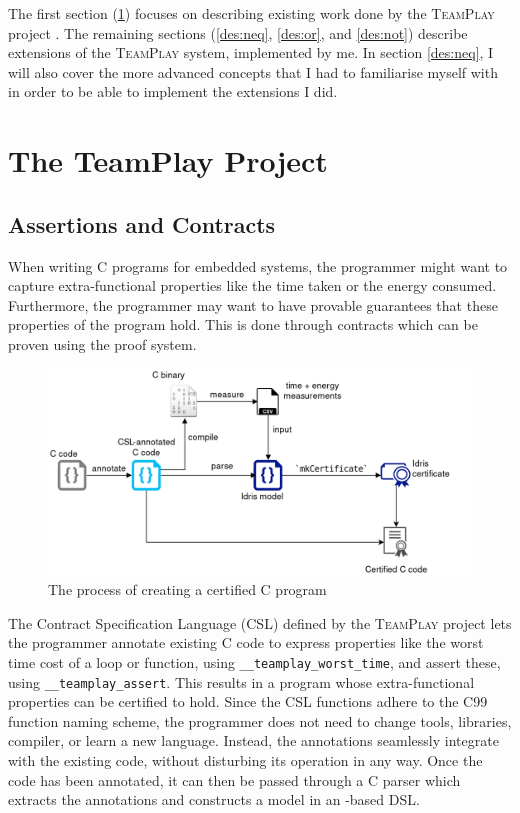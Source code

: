 The first section (\ref{des:tp-dsl}) focuses on describing existing work done by the \textsc{TeamPlay} project \cite{teamplay:d1.1}. The remaining sections (\ref{des:neq}, \ref{des:or}, and \ref{des:not}) describe extensions of the \textsc{TeamPlay} system, implemented by me. In section \ref{des:neq}, I will also cover the more advanced \Idris concepts that I had to familiarise myself with in order to be able to implement the extensions I did.


\section{The TeamPlay Project}\label{des:tp-dsl}
    \subsection{Assertions and Contracts}
        When writing C programs for embedded systems, the programmer might want to capture extra-functional properties like the time taken or the energy consumed. Furthermore, the programmer may want to have provable guarantees that these properties of the program hold. This is done through contracts which can be proven using the \Idris proof system.
        
        \begin{figure}
            \centering
            \includegraphics[width=\textwidth]{diagrams/process.png}
            \caption{The process of creating a certified C program}
        \end{figure}
        
        The Contract Specification Language (CSL) defined by the \textsc{TeamPlay} project \cite{teamplay:d1.1} lets the programmer annotate existing C code to express properties like the worst time cost of a loop or function, using \texttt{\_\_teamplay\_worst\_time}, and assert these, using \texttt{\_\_teamplay\_assert}. This results in a program whose extra-functional properties can be certified to hold. Since the CSL functions adhere to the C99 function naming scheme, the programmer does not need to change tools, libraries, compiler, or learn a new language. Instead, the annotations seamlessly integrate with the existing code, without disturbing its operation in any way. Once the code has been annotated, it can then be passed through a C parser which extracts the annotations and constructs a model in an \Idris-based DSL.
        

